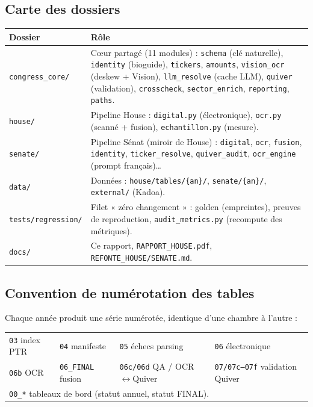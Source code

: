 \documentclass[11pt,a4paper]{article}
\newcommand{\code}[1]{\texttt{\small #1}}
\begin{document}
\subsection{Carte des dossiers}

\begin{center}\small
\begin{tabular}{@{}lp{10.4cm}@{}}
\toprule
\textbf{Dossier} & \textbf{Rôle} \\
\midrule
\code{congress\_core/} & C\oe{}ur partagé (11 modules) : \code{schema} (clé naturelle), \code{identity}
(bioguide), \code{tickers}, \code{amounts}, \code{vision\_ocr} (deskew + Vision), \code{llm\_resolve}
(cache LLM), \code{quiver} (validation), \code{crosscheck}, \code{sector\_enrich}, \code{reporting},
\code{paths}. \\
\code{house/} & Pipeline House : \code{digital.py} (électronique), \code{ocr.py} (scanné + fusion),
\code{echantillon.py} (mesure). \\
\code{senate/} & Pipeline Sénat (miroir de House) : \code{digital}, \code{ocr}, \code{fusion},
\code{identity}, \code{ticker\_resolve}, \code{quiver\_audit}, \code{ocr\_engine} (prompt français)\dots \\
\code{data/} & Données : \code{house/tables/\{an\}/}, \code{senate/\{an\}/}, \code{external/} (Kadoa). \\
\code{tests/regression/} & Filet « zéro changement » : golden (empreintes), preuves de reproduction,
\code{audit\_metrics.py} (recompute des métriques). \\
\code{docs/} & Ce rapport, \code{RAPPORT\_HOUSE.pdf}, \code{REFONTE\_HOUSE/SENATE.md}. \\
\bottomrule
\end{tabular}
\end{center}

\subsection{Convention de numérotation des tables}

Chaque année produit une série numérotée, identique d'une chambre à l'autre :

\begin{center}\small
\begin{tabular}{@{}llll@{}}
\toprule
\code{03} index PTR & \code{04} manifeste & \code{05} échecs parsing & \code{06} électronique \\
\code{06b} OCR & \code{06\_FINAL} fusion & \code{06c/06d} QA / OCR$\leftrightarrow$Quiver &
\code{07/07c--07f} validation Quiver \\
\multicolumn{4}{l}{\code{00\_*} tableaux de bord (statut annuel, statut FINAL).} \\
\bottomrule
\end{tabular}
\end{center}
\end{document}
